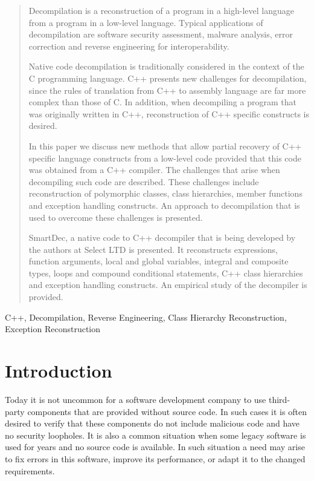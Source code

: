 \documentclass[10pt, conference, compsocconf]{IEEEtran}
\newcommand{\skipsectionspace}{}
\begin{document}
\begin{abstract}\skipsectionspace
Decompilation is a reconstruction of a program in a high-level
language from a program in a low-level language. 
Typical applications of decompilation are software security 
assessment, malware analysis, error correction and reverse 
engineering for interoperability.

Native code decompilation is traditionally considered in the 
context of the C programming language.
C++ presents new challenges for decompilation, since the rules
of translation from C++ to assembly language are far more
complex than those of C.
In addition, when decompiling a program that was originally written
in C++, reconstruction of C++ specific constructs is desired.

In this paper we discuss new methods that allow partial
recovery of C++ specific language constructs from a low-level
code provided that this code was obtained from a C++ compiler.
The challenges that arise when decompiling such code are described. 
These challenges include reconstruction of polymorphic classes, class 
hierarchies, member functions and exception handling constructs.
An approach to decompilation that is used to overcome these challenges 
is presented.

SmartDec, a native code to C++ decompiler that is being 
developed by the authors at Select LTD is presented.
It reconstructs expressions, function arguments, local and global variables,
integral and composite types, loops and compound conditional statements,
C++ class hierarchies and exception handling constructs.
An empirical study of the decompiler is provided.
\end{abstract}

\begin{IEEEkeywords}
C++, Decompilation, Reverse Engineering, Class Hierarchy Reconstruction, Exception Reconstruction
\end{IEEEkeywords}


\section{Introduction}\skipsectionspace
Today it is not uncommon for a software development company to use
third-party components that are provided without source code.
In such cases it is often desired to verify that these components 
do not include malicious code and have no security loopholes. 
It is also a common situation when some legacy software 
is used for years and no source code is available.
In such situation a need may arise to fix errors in this software, 
improve its performance, or adapt it to the changed requirements. 
\end{document}
